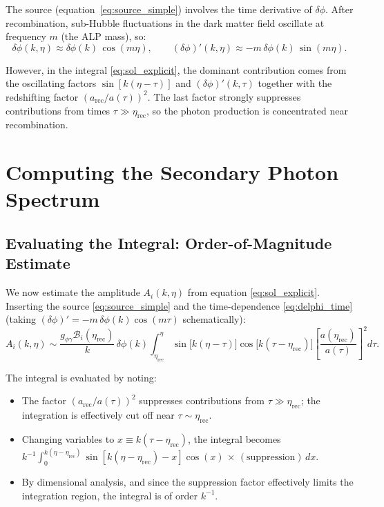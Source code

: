 \documentclass[12pt,a4paper]{report}
\newcommand{\gag}{g_{\phi\gamma}}
\theoremstyle{definition}
\begin{document}
The source (equation~\eqref{eq:source_simple}) involves the time derivative of
$\delta\phi$. After recombination, sub-Hubble fluctuations in the dark matter field
oscillate at frequency $m$ (the ALP mass), so:
\begin{equation}
  \delta\phi(k,\eta) \approx \delta\phi(k)\,\cos(m\eta),
  \qquad
  (\delta\phi)'(k,\eta) \approx -m\,\delta\phi(k)\,\sin(m\eta).
  \label{eq:delphi_time}
\end{equation}

However, in the integral \eqref{eq:sol_explicit}, the dominant contribution comes from
the oscillating factors $\sin[k(\eta-\tau)]$ and $(\delta\phi)'(k,\tau)$ together with
the redshifting factor $(a_{\mathrm{rec}}/a(\tau))^2$. The last factor strongly suppresses
contributions from times $\tau\gg\eta_{\mathrm{rec}}$, so the photon production is
concentrated near recombination.

\chapter{Computing the Secondary Photon Spectrum}

\section{Evaluating the Integral: Order-of-Magnitude Estimate}

We now estimate the amplitude $A_i(k,\eta)$ from equation \eqref{eq:sol_explicit}.
Inserting the source \eqref{eq:source_simple} and the time-dependence
\eqref{eq:delphi_time} (taking $(\delta\phi)'=-m\,\delta\phi(k)\cos(m\tau)$
schematically):
\begin{equation}
  A_i(k,\eta) \sim \frac{\gag\mathcal{B}_i({\eta_{\mathrm{rec}}})}{k}\,
  \delta\phi(k)\int_{\eta_{\mathrm{rec}}}^{\eta}
  \sin\!\bigl[k(\eta-\tau)\bigr]\cos\!\bigl[k(\tau-\eta_{\mathrm{rec}})\bigr]
  \left[\frac{a(\eta_{\mathrm{rec}})}{a(\tau)}\right]^2 d\tau.
  \label{eq:Ai_int}
\end{equation}

The integral is evaluated by noting:

\begin{itemize}
  \item The factor $(a_{\mathrm{rec}}/a(\tau))^2$ suppresses contributions from
    $\tau\gg\eta_{\mathrm{rec}}$; the integration is effectively cut off near
    $\tau\sim\eta_{\mathrm{rec}}$.
  \item Changing variables to $x\equiv k(\tau-\eta_{\mathrm{rec}})$, the integral
    becomes $k^{-1}\int_0^{k(\eta-\eta_{\mathrm{rec}})}
    \sin[k(\eta-\eta_{\mathrm{rec}})-x]\cos(x)\,\times\,(\text{suppression})\,dx$.
  \item By dimensional analysis, and since the suppression factor effectively limits
    the integration region, the integral is of order $k^{-1}$.
\end{itemize}
\end{document}
